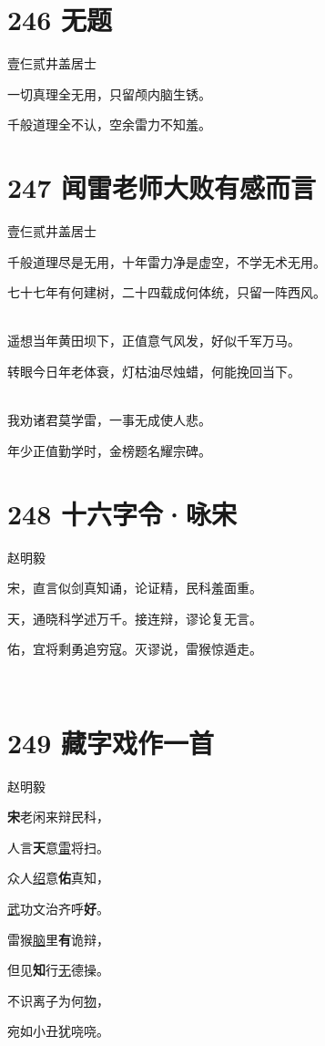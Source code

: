 \documentclass[UTF8,12pt,oneside]{ctexbook}
\def\pau#1{\begin{center} {#1} \end{center}} %
\def\poem#1#2{\section{#1}\pau{#2}} %
\begin{document}
        \poem{246 无题}{壹仨贰井盖居士}
        \begin{center}
        一切真理全无用，只留颅内脑生锈。
        
        千般道理全不认，空余雷力不知羞。
        \end{center}

        \poem{247 闻雷老师大败有感而言}{壹仨贰井盖居士}
        \begin{center}
        千般道理尽是无用，十年雷力净是虚空，不学无术无用。
        
        七十七年有何建树，二十四载成何体统，只留一阵西风。
        
        ~\\

        遥想当年黄田坝下，正值意气风发，好似千军万马。

        转眼今日年老体衰，灯枯油尽烛蜡，何能挽回当下。
        
        ~\\

        我劝诸君莫学雷，一事无成使人悲。

        年少正值勤学时，金榜题名耀宗碑。
        \end{center}

        \poem{248 十六字令·咏宋}{赵明毅}
        \begin{center}
        宋，直言似剑真知诵，论证精，民科羞面重。
        
        天，通晓科学述万千。接连辩，谬论复无言。
        
        佑，宜将剩勇追穷寇。灭谬说，雷猴惊遁走。

        ~\\
        \end{center}

        \poem{249 藏字戏作一首}{赵明毅}
        \begin{center}
        \textbf{宋}老闲来辩民科，

        人言\textbf{天}意\underline{雷}将扫。
        
        众人\underline{绍}意\textbf{佑}真知，
        
        \underline{武}功文治齐呼\textbf{好}。
        
        雷猴\underline{脑}里\textbf{有}诡辩，
        
        但见\textbf{知}行\underline{无}德操。
        
        不识离子为何\underline{物}，
        
        宛如小丑犹哓哓。
        \end{center}
\end{document}
